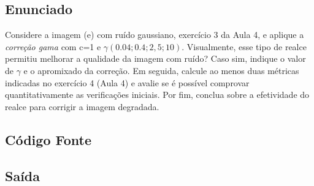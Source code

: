 \documentclass[10pt,a4paper]{article}
\begin{document}
\subsection{Enunciado}

Considere a imagem (e) com ruído gaussiano, exercício 3 da Aula 4, e aplique a \textit{correção gama} com c=1 e \( {\gamma} (0.04; 0.4; 2,5; 10)\). Visualmente, esse tipo de realce permitiu melhorar a qualidade da imagem com ruído? Caso sim, indique o valor de \({\gamma}\) e o apromixado da correção. Em seguida, calcule ao menos duas métricas indicadas no exercício 4 (Aula 4) e avalie se é possível comprovar quantitativamente as verificações iniciais. Por fim, conclua sobre a efetividade do realce para corrigir a imagem degradada.

\subsection{Código Fonte}



\subsection{Saída}


\end{document}

